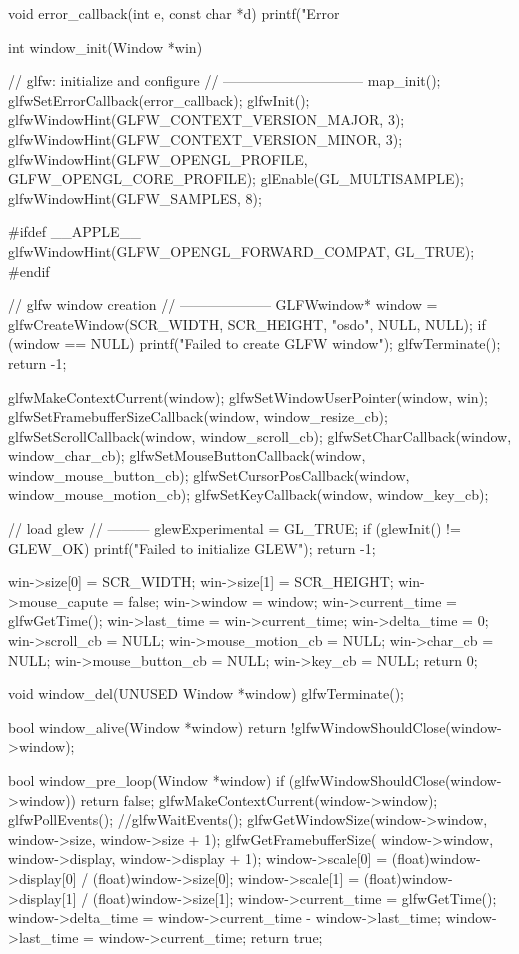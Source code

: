 \begin{multicols}{2}
\begin{ccode}
void error_callback(int e, const char *d) {
    printf("Error %
}

int window_init(Window *win) {
    // glfw: initialize and configure
    // ------------------------------
    map_init();
    glfwSetErrorCallback(error_callback);
    glfwInit();
    glfwWindowHint(GLFW_CONTEXT_VERSION_MAJOR, 3);
    glfwWindowHint(GLFW_CONTEXT_VERSION_MINOR, 3);
    glfwWindowHint(GLFW_OPENGL_PROFILE, GLFW_OPENGL_CORE_PROFILE);
    glEnable(GL_MULTISAMPLE);
    glfwWindowHint(GLFW_SAMPLES, 8);

#ifdef __APPLE__
    glfwWindowHint(GLFW_OPENGL_FORWARD_COMPAT, GL_TRUE);
#endif

    // glfw window creation
    // --------------------
    GLFWwindow* window = glfwCreateWindow(SCR_WIDTH, SCR_HEIGHT, "osdo",
                                          NULL, NULL);
    if (window == NULL) {
        printf("Failed to create GLFW window\n");
        glfwTerminate();
        return -1;
    }

    glfwMakeContextCurrent(window);
    glfwSetWindowUserPointer(window, win);
    glfwSetFramebufferSizeCallback(window, window_resize_cb);
    glfwSetScrollCallback(window, window_scroll_cb);
    glfwSetCharCallback(window, window_char_cb);
    glfwSetMouseButtonCallback(window, window_mouse_button_cb);
    glfwSetCursorPosCallback(window, window_mouse_motion_cb);
    glfwSetKeyCallback(window, window_key_cb);

    // load glew
    // ---------
    glewExperimental = GL_TRUE;
    if (glewInit() != GLEW_OK) {
        printf("Failed to initialize GLEW\n");
        return -1;
    }

    win->size[0] = SCR_WIDTH;
    win->size[1] = SCR_HEIGHT;
    win->mouse_capute = false;
    win->window = window;
    win->current_time = glfwGetTime();
    win->last_time = win->current_time;
    win->delta_time = 0;
    win->scroll_cb = NULL;
    win->mouse_motion_cb = NULL;
    win->char_cb = NULL;
    win->mouse_button_cb = NULL;
    win->key_cb = NULL;
    return 0;
}

void window_del(UNUSED Window *window) {
    glfwTerminate();
}

bool window_alive(Window *window) {
    return !glfwWindowShouldClose(window->window);
}

bool window_pre_loop(Window *window) {
    if (glfwWindowShouldClose(window->window)) return false;
    glfwMakeContextCurrent(window->window);
    glfwPollEvents();
    //glfwWaitEvents();
    glfwGetWindowSize(window->window, window->size, window->size + 1);
    glfwGetFramebufferSize(
                window->window, window->display, window->display + 1);
    window->scale[0] = (float)window->display[0] / (float)window->size[0];
    window->scale[1] = (float)window->display[1] / (float)window->size[1];
    window->current_time = glfwGetTime();
    window->delta_time = window->current_time - window->last_time;
    window->last_time = window->current_time;
    return true;
}


\end{ccode}
\end{multicols}
